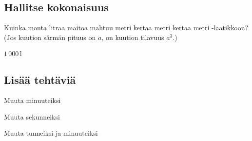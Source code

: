 \begin{tehtavasivu}
\subsection*{Hallitse kokonaisuus}

\begin{tehtava}
Kuinka monta litraa maitoa mahtuu metri kertaa metri kertaa metri -laatikkoon? (Jos kuution särmän pituus on $a$, on kuution tilavuus $a^3$.)
	\begin{vastaus}
	$1\,000$\,l
	\end{vastaus}
\end{tehtava}

\subsection*{Lisää tehtäviä}


\begin{tehtava}
Muuta minuuteiksi
\begin{alakohdat}
\end{alakohdat}
\begin{vastaus}
\begin{alakohdat}
\end{alakohdat}
\end{vastaus}
\end{tehtava}
\begin{tehtava}
Muuta sekunneiksi
\begin{alakohdat}
\end{alakohdat}
\begin{vastaus}
\begin{alakohdat}
\end{alakohdat}
\end{vastaus}
\end{tehtava}

\begin{tehtava}
Muuta tunneiksi ja minuuteiksi
\begin{alakohdat}
\end{alakohdat}
\begin{vastaus}
\begin{alakohdat}
\end{alakohdat}
\end{vastaus}
\end{tehtava}


\end{tehtavasivu}
